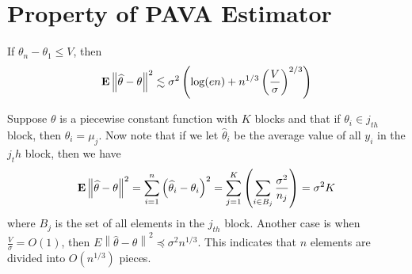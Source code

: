 \documentclass[12pt]{article}
\newcommand{\E}{{\bf E}}
\newcommand{\bra}[1]{\left(#1\right)}
\newcommand{\norm}[1]{\left\|#1\right\|}
\newcommand{\wh}[1]{\widehat{#1}}
\def\beq{\begin{equation}}
\def\eeq{\end{equation}}
\begin{document}
\section{Property of PAVA Estimator}
\begin{theorem}
If $\theta_n-\theta_1\leq V$, then 
\beq
\E \norm{\wh{\theta}-\theta}^2\lesssim \sigma^2\bra{\log (en) + n^{1/3}\bra{\frac{V}{\sigma}}^{2/3} }
\eeq
\end{theorem}
\begin{remark}
Suppose $\theta$ is a piecewise constant function with $K$ blocks and that if $\theta_i\in j_{th}$ block, then $\theta_i=\mu_j$. Now note that if we let $\wh{\theta}_i$ be the average value of all $y_i$ in the $j_th$ block, then we have
\[
\E\norm{\wh{\theta}-\theta}^2=\sum_{i=1}^n\bra{\wh{\theta}_i-\theta_i}^2=\sum_{j=1}^{K}\bra{\sum_{i\in B_j} \frac{\sigma^2}{n_j}}=\sigma^2K
\]
where $B_j$ is the set of all elements in the $j_{th}$ block. Another case is when $\frac{V}{\sigma}=O(1)$, then $E\norm{\wh{\theta}-\theta}^2\preceq \sigma^2 n^{1/3}$. This indicates that $n$ elements are divided into $O(n^{1/3})$ pieces.
\end{remark}
\end{document}
